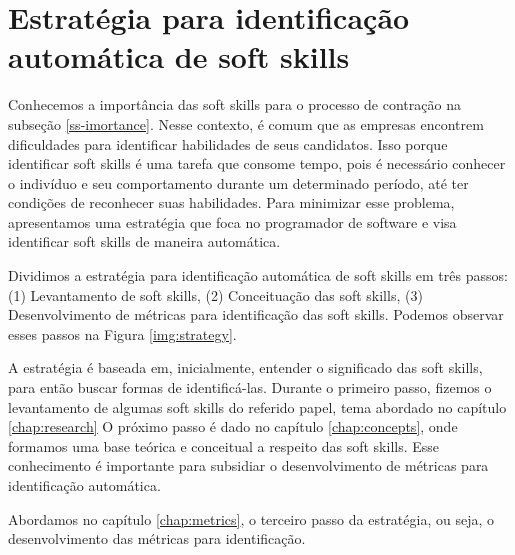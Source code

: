 

\chapter{Estratégia para identificação automática de soft skills}

\label{chap:strategy}

Conhecemos a importância das soft skills para o processo de contração na subseção \ref{ss-imortance}. Nesse contexto, é comum que as empresas encontrem dificuldades para identificar habilidades de seus candidatos. Isso porque identificar soft skills é uma tarefa que consome tempo, pois é necessário conhecer o indivíduo e seu comportamento durante um determinado período, até ter condições de reconhecer suas habilidades. Para minimizar esse problema, apresentamos uma estratégia que foca no programador de software e visa identificar soft skills de maneira automática.

Dividimos a estratégia para identificação automática de soft skills em três passos: (1) Levantamento de soft skills, (2) Conceituação das soft skills, (3) Desenvolvimento de métricas para identificação das soft skills. Podemos observar esses passos na Figura \ref{img:strategy}.

A estratégia é baseada em, inicialmente, entender o significado das soft skills, para então buscar formas de identificá-las.
Durante o primeiro passo, fizemos o levantamento de algumas soft skills do referido papel, tema abordado no capítulo \ref{chap:research}
O próximo passo é dado no capítulo \ref{chap:concepts}, onde formamos uma base teórica e conceitual a respeito das soft skills. Esse conhecimento é importante para subsidiar o desenvolvimento de métricas para identificação automática.

Abordamos no capítulo \ref{chap:metrics}, o terceiro passo da estratégia, ou seja, o desenvolvimento das métricas para identificação. 


